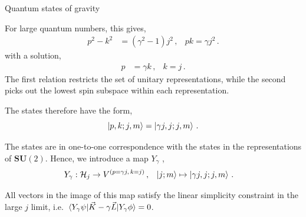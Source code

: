 \documentclass[12pt,titlepage]{article}
\begin{document}
\begin{frame}{Quantum states of gravity}
    \begin{list}{\,}{\leftmargin=1em \itemindent=0em}
        \item<1-> For large quantum numbers, this gives,
        \begin{align}
            p^2-k^2 &=(\gamma^2-1)j^2\,, &pk=\gamma j^2\,.
        \end{align}
        with a solution,
        \begin{align}
            p &=\gamma k\,, & k=j\,.
        \end{align}
        The first relation restricts the set of unitary representations, while the second picks out the lowest spin subspace within each representation.
        \item<2-> The states therefore have the form,
        \begin{equation}
            \ket{p,k;j,m}=\ket{\gamma j,j;j,m}\,.
        \end{equation}
        \item<3-> The states are in one-to-one correspondence with the states in the representations of $\mathbf{SU}(2)$. Hence, we introduce a map $Y_\gamma$ ,
        \begin{align}
            Y_\gamma:\mathcal{H}_j &\to V^{(p=\gamma j,\,k=j)}\,,
            &\ket{j;m}&\mapsto \ket{\gamma j,j;j,m}\,.
        \end{align}
        \item<4-> All vectors in the image of this map satisfy the linear simplicity constraint in the large $j$ limit, i.e. $\mel{Y_\gamma \psi}{\vec{K}-\gamma\vec{L}}{Y_\gamma \phi}=0$.
    \end{list}
\end{frame}
\end{document}
